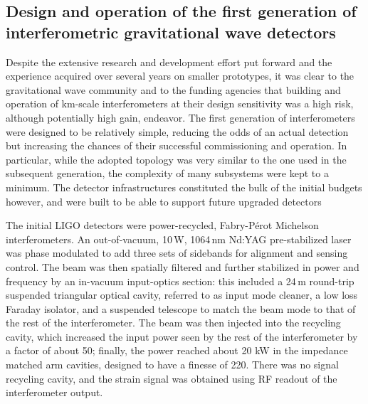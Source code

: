 \subsection{Design and operation of the first generation of interferometric gravitational wave detectors}\label{subsec:1stgen}


Despite the extensive research and development effort put forward and the experience acquired over several years on smaller prototypes, it was clear to the gravitational wave community and to the funding agencies that building and operation of km-scale interferometers at their design sensitivity was a high risk, although potentially high gain, endeavor.
The first generation of interferometers were designed to be relatively simple, reducing the odds of an actual detection but increasing the chances of their successful commissioning and operation.
In particular, while the adopted topology was very similar to the one used in the subsequent generation, the complexity of many subsystems were kept to a minimum.
The detector infrastructures constituted the bulk of the initial budgets however, and were built to be able to support future upgraded detectors

The initial LIGO detectors\cite{Abbott_2004,Abbott_2009} were power-recycled, Fabry-P\'{e}rot Michelson interferometers.
An out-of-vacuum, 10\,W, 1064\,nm Nd:YAG pre-stabilized laser was phase modulated to add three sets of sidebands for alignment and sensing control.
The beam was then spatially filtered and further stabilized in power and frequency by an in-vacuum input-optics section: this included a 24\,m round-trip suspended triangular optical cavity, referred to as input mode cleaner, a low loss Faraday isolator, and a suspended telescope to match the beam mode to that of the rest of the interferometer.
The beam was then injected into the recycling cavity,
which increased the input power seen by the rest of the interferometer by a factor of about 50; finally, the power reached about 20 kW in the impedance matched arm cavities, designed to have a finesse of 220. There was no signal recycling cavity, and the strain signal was obtained using RF readout of the interferometer output.

